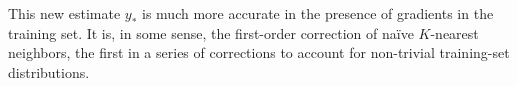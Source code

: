 \documentclass[modern]{aastex63}
\begin{document}
This new estimate $y_\ast$ is much more accurate in the presence of gradients
in the training set.
It is, in some sense, the first-order correction of na\"ive $K$-nearest
neighbors, the first in a series of corrections to account for non-trivial
training-set distributions.



\end{document}
